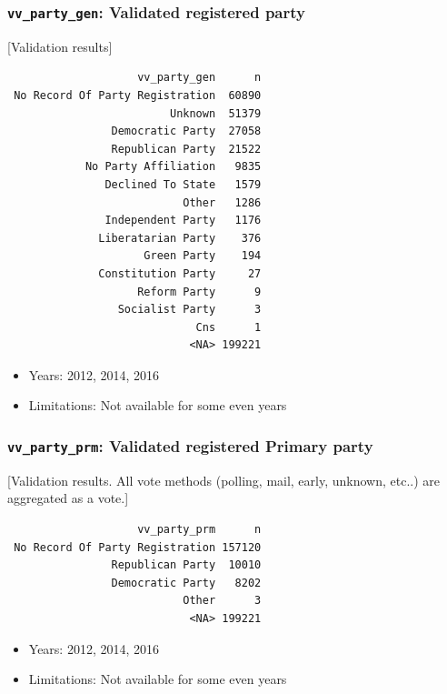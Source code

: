 \documentclass[10pt,article,oneside]{memoir}
\theoremstyle{definition}
\begin{document}
\subsubsection{\texorpdfstring{\texttt{vv\_party\_gen}: Validated
registered
party}{vv\_party\_gen: Validated registered party}}\label{vv_party_gen-validated-registered-party}

{[}Validation results{]}

\begin{verbatim}
                    vv_party_gen      n
 No Record Of Party Registration  60890
                         Unknown  51379
                Democratic Party  27058
                Republican Party  21522
            No Party Affiliation   9835
               Declined To State   1579
                           Other   1286
               Independent Party   1176
              Liberatarian Party    376
                     Green Party    194
              Constitution Party     27
                    Reform Party      9
                 Socialist Party      3
                             Cns      1
                            <NA> 199221
\end{verbatim}

\begin{itemize}
\tightlist
\item
  Years: 2012, 2014, 2016
\item
  Limitations: Not available for some even years
\end{itemize}

\subsubsection{\texorpdfstring{\texttt{vv\_party\_prm}: Validated
registered Primary
party}{vv\_party\_prm: Validated registered Primary party}}\label{vv_party_prm-validated-registered-primary-party}

{[}Validation results. All vote methods (polling, mail, early, unknown,
etc..) are aggregated as a vote.{]}

\begin{verbatim}
                    vv_party_prm      n
 No Record Of Party Registration 157120
                Republican Party  10010
                Democratic Party   8202
                           Other      3
                            <NA> 199221
\end{verbatim}

\begin{itemize}
\tightlist
\item
  Years: 2012, 2014, 2016
\item
  Limitations: Not available for some even years
\end{itemize}
\end{document}
